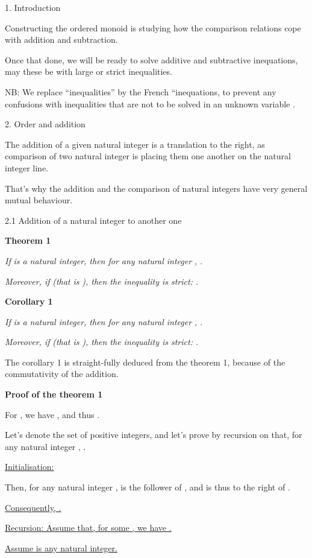 \documentclass{article}
\begin{document}
1. Introduction

Constructing the ordered monoid  is studying how the comparison relations cope with addition and subtraction.

Once that done, we will be ready to solve additive and subtractive inequations, may these be with large or strict inequalities.

NB: We replace “inequalities” by the French “inequations, to prevent any confusions with inequalities that are not to be solved in an unknown variable .

2. Order and addition

The addition of a given natural integer is a translation to the right, as comparison of two natural integer is placing them one another on the natural integer line.

That’s why the addition and the comparison of natural integers have very general mutual behaviour.

2.1 Addition of a natural integer to another one

\textbf{Theorem 1}

\emph{If }\emph{ is a natural integer, then for any natural integer }\emph{, }\emph{.}

\emph{Moreover, if }\emph{ (that is }\emph{), then the inequality is strict: }\emph{.}

\textbf{Corollary 1}

\emph{If }\emph{ is a natural integer, then for any natural integer }\emph{, }\emph{.}

\emph{Moreover, if }\emph{ (that is }\emph{), then the inequality is strict: }\emph{.}

The corollary 1 is straight-fully deduced from the theorem 1, because of the commutativity of the addition.



\textbf{Proof of the theorem 1}

For , we have , and thus .

Let’s denote  the set of positive integers, and let’s prove by recursion on  that, for any natural integer , .

\ul{Initialisation}\ul{: }

Then, for any natural integer ,  is the follower of , and is thus to the right of .

\ul{Consequently, }\ul{.}

\ul{Recursion}\ul{: Assume that, for some }\ul{, we have }\ul{.}

\ul{Assume }\ul{ is any natural integer.}
\end{document}

